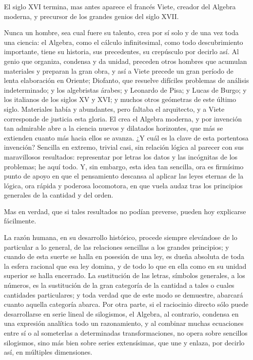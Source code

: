 \documentclass[a4paper, 12pt]{article}
\begin{document}
{El siglo XVI termina, mas antes aparece el francés Viete, creador del Algebra moderna, y precursor de los grandes genios del siglo XVII.

Nunca un hombre, sea cual fuere su talento, crea por sí solo y de una vez toda una ciencia: el Algebra, como el cálculo infinitesimal, como todo descubrimiento importante, tiene su historia, sus precedentes, su crepúsculo por decirlo así.  Al genio que organiza, condensa y da unidad, preceden otros hombres que acumulan materiales y preparan la gran obra, y así a Viete precede un gran período de lenta elaboración en Oriente; Diofanto, que resuelve difíciles problemas de análisis indeterminado; y los algebristas árabes; y Leonardo de Pisa; y Lucas de Burgo; y los italianos de los siglos XV y XVI; y muchos otros geómetras de este último siglo.  Materiales había y abundantes, pero faltaba el arquitecto, y a Viete corresponde de justicia esta gloria.  El crea el Algebra moderna, y por invención tan admirable abre a la ciencia nuevos y dilatados horizontes, que más se extienden cuanto más hacia ellos se avanza. ¿Y cuál es la clave de esta portentosa invención?  Sencilla en extremo, trivial casi, sin relación lógica al parecer con sus maravillosos resultados: representar por letras los datos y las incógnitas de los problemas; he aquí todo.  Y, sin embargo, esta idea tan sencilla, ora es firmísimo punto de apoyo en que el pensamiento descansa al aplicar las leyes eternas de la lógica, ora rápida y poderosa locomotora, en que vuela audaz tras los principios generales de la cantidad y del orden.



Mas en verdad, que si tales resultados no podían preverse, pueden hoy explicarse fácilmente.

La razón humana, en su desarrollo histórico, procede siempre elevándose de lo particular a lo general, de las relaciones sencillas a los grandes principios; y cuando de esta suerte se halla en posesión de una ley, es dueña absoluta de toda la esfera racional que esa ley domina, y de todo lo que en ella como en su unidad superior se halla encerrado.  La sustitución de las letras, símbolos generales, a los números, es la sustitución de la gran categoría de la cantidad a tales o cuales cantidades particulares; y toda verdad que de este modo se demuestre, abarcará cuanto aquella categoría abarca.  Por otra parte, si el raciocinio directo sólo puede desarrollarse en serie lineal de silogismos, el Algebra, al contrario, condensa en una expresión analítica todo un razonamiento, y al combinar muchas ecuaciones entre sí o al someterlas a determinadas transformaciones, no opera sobre sencillos silogismos, sino más bien sobre series extensísimas, que une y enlaza, por decirlo así, en múltiples dimensiones.

}
\end{document}

